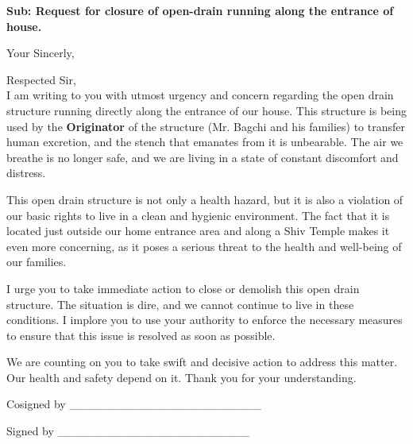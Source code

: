 \documentclass[11pt,a4paper,roman]{moderncv}
\begin{document}
\date{April, 25 2023}

\opening{\textbf{Sub: Request for closure of open-drain running along the entrance of house.}}
\closing{Your Sincerly, \vspace{-1em}}



\makelettertitle



Respected Sir,
\\
\vspace{1em}
I am writing to you with utmost urgency and concern regarding the open drain structure running directly along the entrance of our house.
This structure is being used by the \textbf{Originator} of the structure (Mr. Bagchi and his families) 
to transfer human excretion, and the stench that emanates from it is unbearable.
The air we breathe is no longer safe, and we are living in a state of constant discomfort and distress.


\vspace{1em}
This open drain structure is not only a health hazard, but it is also a 
violation of our basic rights to live in a clean and hygienic environment. 
The fact that it is located just outside our home entrance area and along a Shiv Temple
makes it even more concerning, as it poses a serious threat to the health and well-being of our families.

\vspace{1em}
I urge you to take immediate action to close or demolish this open drain structure.
The situation is dire, and we cannot continue to live in these conditions. I implore you to use your authority to enforce the necessary measures to ensure that this issue is resolved as soon as possible.


\vspace{1em}
We are counting on you to take swift and decisive action to address this matter. Our health and safety depend on it.
Thank you for your understanding.
\vspace{0.5cm}


\makeletterclosing

Cosigned by \_\_\_\_\_\_\_\_\_\_\_\_\_\_\_\_\_\_\_\_\_\_\_\

\vspace{1em}
Signed by \_\_\_\_\_\_\_\_\_\_\_\_\_\_\_\_\_\_\_\_\_\_\_\
\end{document}
